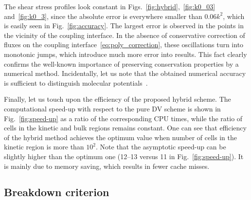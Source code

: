 \documentclass{elsarticle} %
\begin{document}
The shear stress profiles look constant in Figs.~\ref{fig:hybrid},~\ref{fig:k0_03} and~\ref{fig:k0_3},
since the absolute error is everywhere smaller than \(0.06k^2\), which is easily seen in Fig.~\ref{fig:accuracy}.
The largest error is observed in the points in the vicinity of the coupling interface.
In the absence of conservative correction of fluxes on the coupling interface~\eqref{eq:poly_correction},
these oscillations turn into monotonic jumps, which introduce much more error into results.
This fact clearly confirms the well-known importance of preserving conservation properties by a numerical method.
Incidentally, let us note that the obtained numerical accuracy is sufficient
to distinguish molecular potentials~\cite{Sharipov2013, Su2018}.


Finally, let us touch upon the efficiency of the proposed hybrid scheme.
The computational speed-up with respect to the pure DV scheme is shown in Fig.~\ref{fig:speed-up} as a ratio of the corresponding CPU times,
while the ratio of cells in the kinetic and bulk regions remains constant.
One can see that efficiency of the hybrid method achieves the optimum value when number of cells in the kinetic region is more than $10^2$.
Note that the asymptotic speed-up can be slightly higher than the optimum one (12--13 versus 11 in Fig.~\ref{fig:speed-up}).
It is mainly due to memory saving, which results in fewer cache misses.

\subsection{Breakdown criterion}
\end{document}
